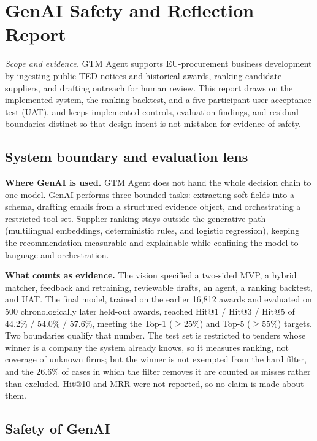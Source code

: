 \chapter{GenAI Safety and Reflection Report}

\textit{Scope and evidence.} GTM Agent supports EU-procurement business development by
ingesting public TED notices and historical awards, ranking candidate suppliers, and
drafting outreach for human review. This report draws on the implemented system, the
ranking backtest, and a five-participant user-acceptance test (UAT), and keeps
implemented controls, evaluation findings, and residual boundaries distinct so that
design intent is not mistaken for evidence of safety.

\section{System boundary and evaluation lens}

\textbf{Where GenAI is used.} GTM Agent does not hand the whole decision chain to one
model. GenAI performs three bounded tasks: extracting soft fields into a schema,
drafting emails from a structured evidence object, and orchestrating a restricted tool
set. Supplier ranking stays outside the generative path (multilingual embeddings,
deterministic rules, and logistic regression), keeping the recommendation measurable
and explainable while confining the model to language and orchestration.

\textbf{What counts as evidence.} The vision specified a two-sided MVP, a hybrid
matcher, feedback and retraining, reviewable drafts, an agent, a ranking backtest, and
UAT. The final model, trained on the earlier 16,812 awards and evaluated on 500
chronologically later held-out awards, reached Hit@1 / Hit@3 / Hit@5 of
44.2\% / 54.0\% / 57.6\%, meeting the Top-1 ($\geq25\%$) and Top-5 ($\geq55\%$) targets.
Two boundaries qualify that number. The test set is restricted to tenders whose winner
is a company the system already knows, so it measures ranking, not coverage of unknown
firms; but the winner is not exempted from the hard filter, and the 26.6\% of cases in
which the filter removes it are counted as misses rather than excluded. Hit@10 and MRR
were not reported, so no claim is made about them.

\section{Safety of GenAI}


